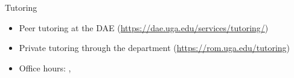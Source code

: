 \documentclass{beamer}
\begin{document}
  \begin{frame}{Tutoring}
    \begin{itemize}
      \item Peer tutoring at the DAE (\url{https://dae.uga.edu/services/tutoring/})
      \item Private tutoring through the department (\url{https://rom.uga.edu/tutoring})
      \item Office hours: , 
    \end{itemize}
  \end{frame}
\end{document}
